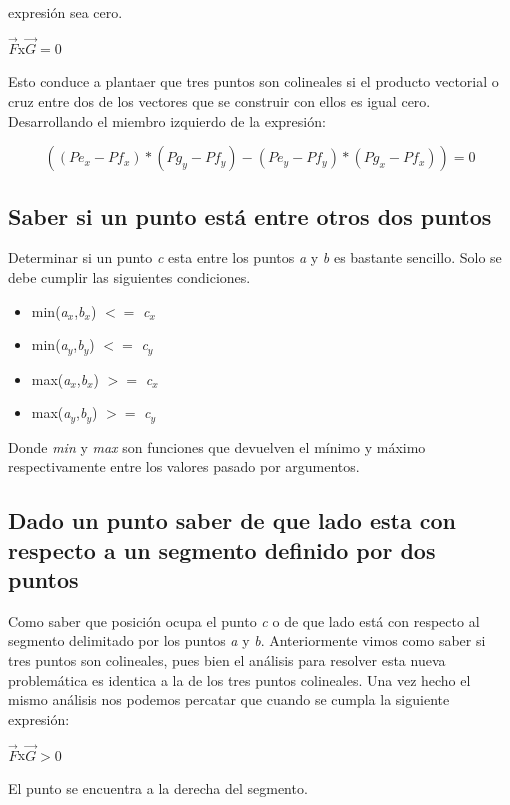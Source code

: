 expresión sea cero.

$\overrightarrow{F}$x$\overrightarrow{G} = 0$

Esto conduce a plantaer que tres puntos son colineales si el producto vectorial o cruz entre dos de los vectores que se construir con ellos es igual cero. Desarrollando el miembro izquierdo de la expresión:

$$ ((Pe_{x} - Pf_{x}) * (Pg_{y} - Pf_{y}) - (Pe_{y} - Pf_{y}) * (Pg_{x} - Pf_{x}))= 0 $$


\subsection{Saber si un punto está entre otros dos puntos}


Determinar si un punto {\em c} esta entre los puntos {\em a} y {\em b} es bastante sencillo. Solo se debe cumplir las siguientes condiciones.

\begin{itemize}
	\item min({\em a$_{x}$},{\em b$_{x}$}) $<=$  {\em c$_{x}$}
	\item min({\em a$_{y}$},{\em b$_{y}$}) $<=$  {\em c$_{y}$}
	\item max({\em a$_{x}$},{\em b$_{x}$}) $>=$  {\em c$_{x}$}
	\item max({\em a$_{y}$},{\em b$_{y}$}) $>=$  {\em c$_{y}$}
\end{itemize}

Donde {\em min} y {\em max} son funciones que devuelven el mínimo y máximo respectivamente entre los valores pasado por argumentos.

\subsection{Dado un punto saber de que lado esta con respecto a un segmento definido por dos puntos}

Como saber que posición ocupa el punto {\em c} o de que lado está con respecto al segmento delimitado por los puntos {\em a} y {\em b}. Anteriormente vimos como saber si tres puntos son colineales, pues bien el análisis para resolver esta nueva problemática es identica a la de los tres puntos colineales. Una vez hecho el mismo análisis nos podemos percatar que cuando se cumpla la siguiente expresión:

$\overrightarrow{F}$x$\overrightarrow{G} > 0$ 

El punto se encuentra a la derecha del segmento.


